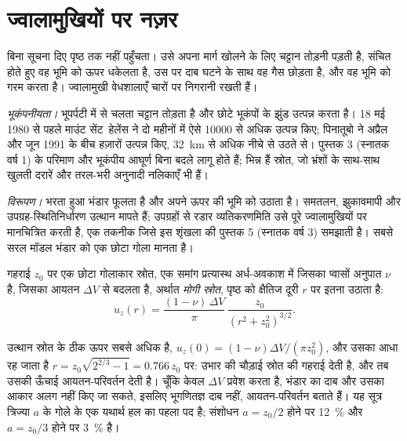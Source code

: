 \section{ज्वालामुखियों पर नज़र}

 बिना सूचना दिए पृष्ठ तक नहीं पहुँचता। उसे अपना मार्ग खोलने के लिए चट्टान
तोड़नी पड़ती है, संचित होते हुए वह भूमि को ऊपर धकेलता है, उस पर दाब घटने के साथ वह
गैस छोड़ता है, और वह भूमि को गरम करता है। ज्वालामुखी वेधशालाएँ चारों पर निगरानी रखती हैं।

\emph{भूकंपनीयता।} भूपर्पटी में से चलता  चट्टान तोड़ता है और छोटे भूकंपों के
झुंड उत्पन्न करता है। 18 मई 1980 से पहले माउंट सेंट~हेलेंस ने दो महीनों में ऐसे
\num{10000} से अधिक उत्पन्न किए; पिनातूबो ने अप्रैल और
जून 1991 के बीच हज़ारों उत्पन्न किए, \qty{32}{km} से अधिक नीचे से उठते  से। पुस्तक 3 (स्नातक वर्ष 1)
के परिमाण और भूकंपीय आघूर्ण बिना बदले लागू होते हैं; भिन्न हैं
स्रोत, जो भ्रंशों के साथ-साथ खुलती दरारें और तरल-भरी अनुनादी नलिकाएँ भी हैं।

\emph{विरूपण।} भरता हुआ भंडार फूलता है और अपने ऊपर की भूमि को उठाता
है। समतलन, झुकावमापी और उपग्रह-स्थितिनिर्धारण उत्थान मापते हैं; उपग्रहों से रडार व्यतिकरणमिति उसे पूरे
ज्वालामुखियों पर मानचित्रित करती है, एक तकनीक जिसे इस शृंखला की पुस्तक 5 (स्नातक वर्ष 3) समझाती है। सबसे सरल
मॉडल भंडार को एक छोटा गोला मानता है।

\begin{proposition}[मोगी स्रोत]\label{prop:b2:eruptive-styles:mogi}
गहराई $z_0$ पर एक छोटा गोलाकार स्रोत, एक समांग प्रत्यास्थ अर्ध-अवकाश में
जिसका प्वासों अनुपात $\nu$ है, जिसका आयतन $\Delta V$ से बदलता है, अर्थात
\emph{मोगी स्रोत}, पृष्ठ को क्षैतिज दूरी $r$ पर इतना
उठाता है:
\[
u_z(r) = \frac{(1 - \nu)\,\Delta V}{\pi}\,\frac{z_0}{(r^2 + z_0^2)^{3/2}} .
\]
\end{proposition}
\admitted

उत्थान स्रोत के ठीक ऊपर सबसे अधिक है, $u_z(0) = (1 - \nu)\Delta V/(\pi z_0^2)$, और
उसका आधा रह जाता है $r = z_0\sqrt{2^{2/3} - 1} = 0.766\,z_0$ पर: उभार की
चौड़ाई स्रोत की गहराई देती है, और तब उसकी ऊँचाई आयतन-परिवर्तन
देती है। चूँकि केवल $\Delta V$ प्रवेश करता है, भंडार का दाब और उसका आकार
अलग नहीं किए जा सकते, इसलिए भूगणितज्ञ दाब नहीं, आयतन-परिवर्तन
बताते हैं। यह सूत्र त्रिज्या $a$ के गोले के एक यथार्थ हल का पहला पद है;
संशोधन $a = z_0/2$ होने पर \qty{12}{\percent} और $a = z_0/3$ होने पर
\qty{3}{\percent} है।


